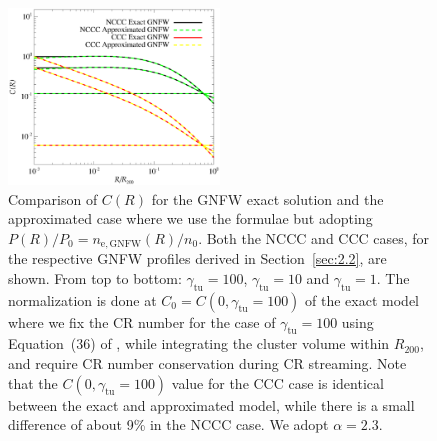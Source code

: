 \documentclass[traditabstract]{aa}
\newcommand{\rmn}{\mathrm}
\begin{document}
\begin{appendix}
\begin{figure}[t!]
\centering
\includegraphics[width=0.5\textwidth]{figures/CR_profiles_REXexactVSfake.eps}
\caption{Comparison of $C(R)$ for the GNFW exact solution and the approximated case where we use the \cite{2011A&A...527A..99E} formulae but adopting $P(R)/P_{0}=n_{\rmn{e,GNFW}}(R)/n_{0}$. Both the NCCC and CCC cases, for the respective GNFW profiles derived in Section~\ref{sec:2.2}, are shown. From top to bottom: $\gamma_{\rmn{tu}}=100$, $\gamma_{\rmn{tu}}=10$ and $\gamma_{\rmn{tu}}=1$. The normalization is done at $C_{0}=C(0,\gamma_{\rmn{tu}}=100)$ of the exact model where we fix the CR number for 
the case of $\gamma_{\rmn{tu}}=100$ using Equation~(36) of \cite{2011A&A...527A..99E}, while integrating the cluster volume within $R_{200}$, and require CR number
conservation during CR streaming. Note that the $C(0,\gamma_{\rmn{tu}}=100)$ value for the CCC case is identical between the exact and approximated model, while there is a small difference of about 9\% in the NCCC case. We adopt $\alpha=2.3$.}
\label{fig:REXexactVSfake}
\end{figure}


\end{appendix}
\end{document}
